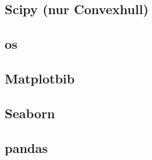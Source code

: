 \subsection{Scipy (nur Convexhull)}
\subsection{os}
\subsection{Matplotbib}
\subsection{Seaborn}
\subsection{pandas}



